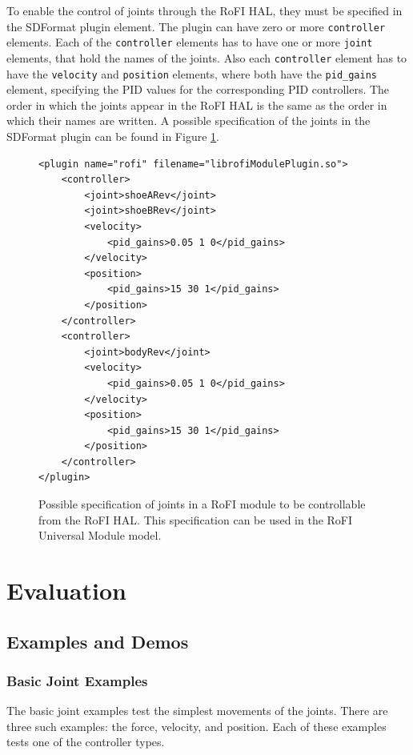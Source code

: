 \documentclass[
  printed, %
  color,   %
  notable, %
  oneside, %
  nolof,   %
  nolot,   %
  nocover,
]{fithesis3}
\newcommand{\code}[1]{\texttt{#1}}
\begin{document}
To enable the control of joints through the RoFI HAL, they must be specified in the SDFormat plugin element.
The plugin can have zero or more \code{controller} elements.
Each of the \code{controller} elements has to have one or more \code{joint} elements, that hold the names of the joints.
Also each \code{controller} element has to have the \code{velocity} and \code{position} elements, where both have the \code{pid\_gains} element, specifying the PID values for the corresponding PID controllers.
The order in which the joints appear in the RoFI HAL is the same as the order in which their names are written.
A possible specification of the joints in the SDFormat plugin can be found in Figure \ref{fig:plugin-sdf}.

\begin{figure}
    \centering
\begin{verbatim}
<plugin name="rofi" filename="librofiModulePlugin.so">
    <controller>
        <joint>shoeARev</joint>
        <joint>shoeBRev</joint>
        <velocity>
            <pid_gains>0.05 1 0</pid_gains>
        </velocity>
        <position>
            <pid_gains>15 30 1</pid_gains>
        </position>
    </controller>
    <controller>
        <joint>bodyRev</joint>
        <velocity>
            <pid_gains>0.05 1 0</pid_gains>
        </velocity>
        <position>
            <pid_gains>15 30 1</pid_gains>
        </position>
    </controller>
</plugin>
\end{verbatim}
    \caption{Possible specification of joints in a RoFI module to be controllable from the RoFI HAL. This specification can be used in the RoFI Universal Module model.}
    \label{fig:plugin-sdf}
\end{figure}


\chapter{Evaluation}

\section{Examples and Demos}

\subsection{Basic Joint Examples}

The basic joint examples test the simplest movements of the joints.
There are three such examples: the force, velocity, and position.
Each of these examples tests one of the controller types.
\end{document}
